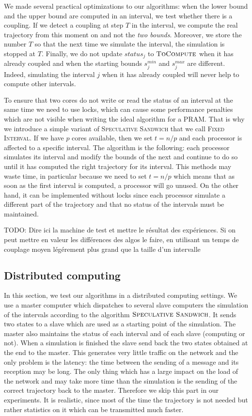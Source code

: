 \documentclass[a4paper,10pt]{article}
\newcommand{\todo}[1]{{\color{red} TODO: {#1}}}
\begin{document}
We made several practical optimizations to our algorithms: when the lower bound and the upper bound are computed in an interval,
we test whether there is a coupling. If we detect a coupling at step $T$ in the interval, we compute the real trajectory 
from this moment on and not the \emph{two bounds}. Moreover, we store the number $T$ so that the next time we simulate 
the interval, the simulation is stopped at $T$. Finally, we do not update $status_j$ to $\textsc{ToCompute}$ when it 
has already coupled and when the starting bounds $s_j^{min}$ and $s_j^{max}$ are different. Indeed, simulating the interval $j$
when it has already coupled will never help to compute other intervals.
 
To ensure that two cores do not write or read the status of an interval at the same time we need to use locks,
which can cause some performance penalties which are not visible when writing the ideal algorithm for a PRAM.
That is why we introduce a simple variant of \textsc{Speculative Sandwich} that we call \textsc{Fixed Interval}.
If we have $p$ cores available, then we set $t = n/p$ and each processor is affected to a specific interval. 
The algorithm is the following:  each processor simulates its interval and modify the bounds of the next and continue to do so until it has computed the right trajectory for its interval. This methods may waste time, in particular because we need to set
$t = n/p$ which means that as soon as the first interval is computed, a processor will go unused. On the other hand, it can be 
implemented without locks since each processor simulate a different part of the trajectory and that no status of the intervals must be maintained.


\todo{Dire ici la machine de test et mettre le résultat des expériences. Si on peut mettre en valeur les différences des algos le faire, en utilisant un temps de couplage moyen légérement plus grand que la taille d'un intervalle}


\subsection{Distributed computing}

In this section, we test our algorithms in a distributed computing settings. We use a master computer which dispatches
to several slave computers the simulation of the intervals according to the algorithm $\textsc{Speculative Sandwich}$.
It sends two states to a slave which are used as a starting point of the simulation. The master also maintains the status of each interval and of each slave (computing or not). When a simulation is finished the slave send back the two states obtained at the end 
to the master. This generates very little traffic on the network and the only problem is the latency: the time between the sending of a message and its reception may be long.  The only thing which has a large impact on the load of the network and may take more time than the simulation is the sending of the correct trajectory back to the master. Therefore we skip this part in our experiments. It is realistic, since most of the time the trajectory is not needed but rather statistics on it which can be transmitted much faster. 
\end{document}
